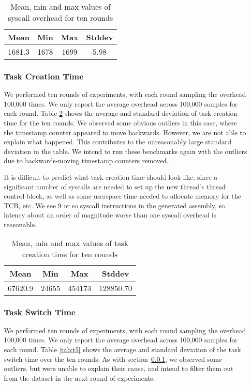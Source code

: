 \begin{table}[tb]

    \caption{Mean, min and max values of syscall overhead for ten rounds}
    
    \begin{tabular}{|c|c|c|c|} 
        \hline
        Mean & Min & Max & Stddev\\ 
        \hline
        1681.3 & 1678 & 1699 & 5.98\\ 
        \hline
       \end{tabular}
        \label{tab:t3}
\end{table}

    
\subsubsection{Task Creation Time}
\label{subsubsec:tct}
We performed ten rounds of experiments, with each round sampling the
overhead 100,000 times. %
We only report the average overhead across 100,000 samples for each
round. %
Table \ref{tab:t4} shows the average and standard deviation of task
creation time for the ten rounds. %
We observed some obvious outliers in this case, where the timestamp
counter appeared to move backwards. %
However, we are not able to explain what happened. %
This contributes to the unreasonably large standard deviation in the
table. %
We intend to run these benchmarks again with the outliers due to
backwards-moving timestamp counters removed. %

It is difficult to predict what task creation time should look like,
since a significant number of syscalls are needed to set up the new
thread's thread control block, as well as some userspace time needed
to allocate memory for the TCB, etc.
%
We see 9 or so syscall instructions in the generated assembly, so
latency about an order of magnitude worse than one syscall overhead is
reasonable.

\begin{table}[htb]

    \caption{Mean, min and max values of task creation time for ten rounds}
\begin{tabular}{|c|c|c|c|} 
    \hline
    Mean & Min & Max & Stddev\\ 
    \hline
    67620.9 & 24655 & 454173 & 128850.70\\ 
    \hline
   \end{tabular}
    \label{tab:t4}
\end{table}

\subsubsection{Task Switch Time}
We performed ten rounds of experiments, with each round sampling the
overhead 100,000 times. %
We only report the average overhead across 100,000 samples for each
round. %
Table \ref{tab:t5} shows the average and standard deviation of the
task switch time over the ten rounds. %
As with section~\ref{subsubsec:tct}, we observed some outliers, but
were unable to explain their cause, and intend to filter them out from
the dataset in the next round of experiments.

